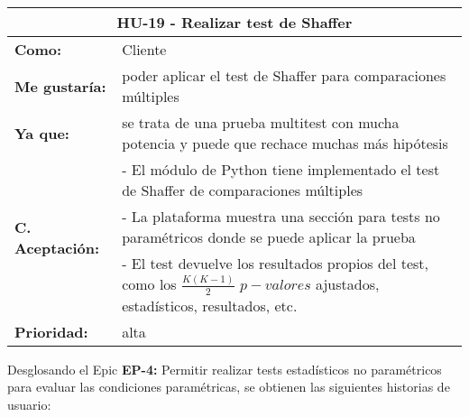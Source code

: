 
\begin{table}[H]
	\begin{tabular}{| p{3cm}| p{11cm} |}
		\hline
		\multicolumn{2}{|c|}{\textbf{HU-19} - Realizar test de Shaffer} \\ \hline
		\textbf{Como:} & Cliente \\ \hline
		\textbf{Me gustaría:} & poder aplicar el test de Shaffer para comparaciones múltiples \\ \hline
		\textbf{Ya que:} & se trata de una prueba multitest con mucha potencia y puede que rechace muchas más hipótesis \\ \hline
		\multirow{3}{11cm}{\textbf{C. Aceptación:}} & - El módulo de Python tiene implementado el test de Shaffer de comparaciones múltiples \\
		& - La plataforma muestra una sección para tests no paramétricos donde se puede aplicar la prueba \\
		& - El test devuelve los resultados propios del test, como los $\frac{K(K-1)}{2}$ $p-valores$ ajustados, estadísticos, resultados, etc. \\ \hline
		\textbf{\textbf{Prioridad:}} & alta \\ \hline
	\end{tabular}
\end{table}


\clearpage
Desglosando el Epic \textbf{EP-4:} Permitir realizar tests estadísticos no paramétricos para evaluar las condiciones paramétricas, se obtienen las siguientes historias de usuario:

